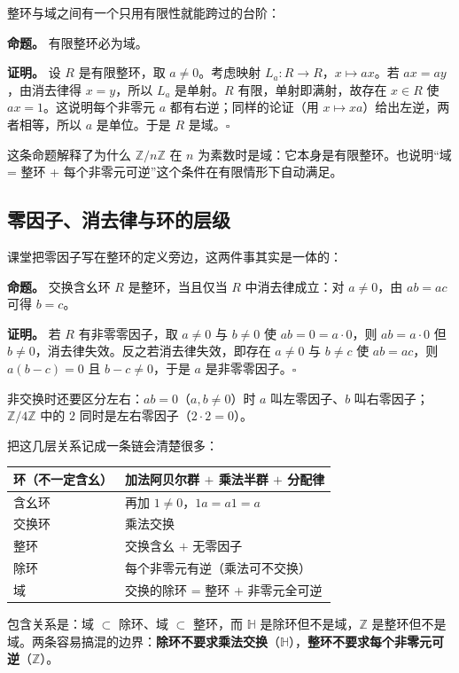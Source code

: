 整环与域之间有一个只用有限性就能跨过的台阶：

\textbf{命题。} 有限整环必为域。

\textbf{证明。} 设 $R$ 是有限整环，取 $a\ne0$。考虑映射 $L_a:R\to R$，$x\mapsto ax$。若 $ax=ay$，由消去律得 $x=y$，所以 $L_a$ 是单射。$R$ 有限，单射即满射，故存在 $x\in R$ 使 $ax=1$。这说明每个非零元 $a$ 都有右逆；同样的论证（用 $x\mapsto xa$）给出左逆，两者相等，所以 $a$ 是单位。于是 $R$ 是域。$\square$

这条命题解释了为什么 $\mathbb Z/n\mathbb Z$ 在 $n$ 为素数时是域：它本身是有限整环。也说明“域 = 整环 + 每个非零元可逆”这个条件在有限情形下自动满足。

\subsection{零因子、消去律与环的层级}


课堂把零因子写在整环的定义旁边，这两件事其实是一体的：

\textbf{命题。} 交换含幺环 $R$ 是整环，当且仅当 $R$ 中消去律成立：对 $a\ne0$，由 $ab=ac$ 可得 $b=c$。

\textbf{证明。} 若 $R$ 有非零零因子，取 $a\ne0$ 与 $b\ne0$ 使 $ab=0=a\cdot0$，则 $ab=a\cdot0$ 但 $b\ne0$，消去律失效。反之若消去律失效，即存在 $a\ne0$ 与 $b\ne c$ 使 $ab=ac$，则 $a(b-c)=0$ 且 $b-c\ne0$，于是 $a$ 是非零零因子。$\square$

非交换时还要区分左右：$ab=0$（$a,b\ne0$）时 $a$ 叫左零因子、$b$ 叫右零因子；$\mathbb Z/4\mathbb Z$ 中的 $2$ 同时是左右零因子（$2\cdot2=0$）。

把这几层关系记成一条链会清楚很多：


\begin{center}
\begin{tabular}{ll}
环（不一定含幺） & 加法阿贝尔群 $+$ 乘法半群 $+$ 分配律\\ \hline
含幺环 & 再加 $1\ne0$，$1a=a1=a$\\
交换环 & 乘法交换\\
整环 & 交换含幺 $+$ 无零因子\\
除环 & 每个非零元有逆（乘法可不交换）\\
域 & 交换的除环 \;=\; 整环 $+$ 非零元全可逆
\end{tabular}
\end{center}


包含关系是：域 $\subset$ 除环、域 $\subset$ 整环，而 $\mathbb H$ 是除环但不是域，$\mathbb Z$ 是整环但不是域。两条容易搞混的边界：\textbf{除环不要求乘法交换}（$\mathbb H$），\textbf{整环不要求每个非零元可逆}（$\mathbb Z$）。

